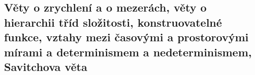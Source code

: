 \subsection{Věty o zrychlení a o mezerách, věty o hierarchii tříd složitosti, konstruovatelné funkce, vztahy mezi časovými a prostorovými mírami a determinismem a nedeterminismem, Savitchova věta}